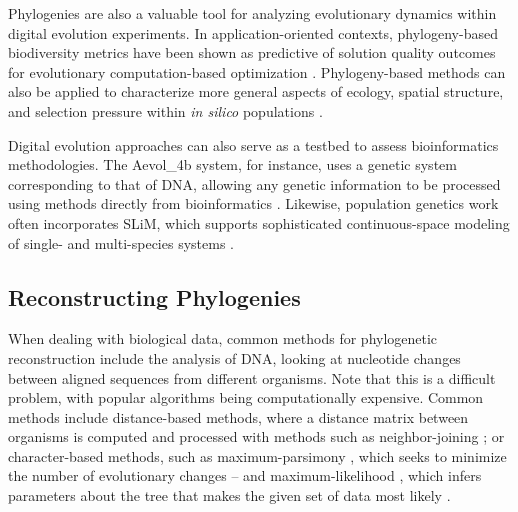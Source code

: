 

Phylogenies are also a valuable tool for analyzing evolutionary dynamics within digital evolution experiments.
In application-oriented contexts, phylogeny-based biodiversity metrics have been shown as predictive of solution quality outcomes for evolutionary computation-based optimization \citep{hernandez2022phylogenetic}.
Phylogeny-based methods can also be applied to characterize more general aspects of ecology, spatial structure, and selection pressure within \textit{in silico} populations \citep{moreno2023toward}.

Digital evolution approaches can also serve as a testbed to assess bioinformatics methodologies.
The Aevol\_4b system, for instance, uses a genetic system corresponding to that of DNA, allowing any genetic information to be processed using methods directly from bioinformatics \citep{daudey2024aevol}.
Likewise, population genetics work often incorporates SLiM, which supports sophisticated continuous-space modeling of single- and multi-species systems \citep{haller2023slim}.

\subsection{Reconstructing Phylogenies} \label{sec:introduction:reconst}

When dealing with biological data, common methods for phylogenetic reconstruction include the analysis of DNA, looking at nucleotide changes between aligned sequences from different organisms. Note that this is a difficult problem, with popular algorithms being computationally expensive.
Common methods include distance-based methods, where a distance matrix between organisms is computed and processed with methods such as neighbor-joining \citep{saitou1987neighbor}; or character-based methods, such as maximum-parsimony \citep{sober1991reconstructing}, which seeks to minimize the number of evolutionary changes -- and maximum-likelihood \citep{felsenstein1981evolutionary}, which infers parameters about the tree that makes the given set of data most likely \citep{de2014phylogenetic}.

